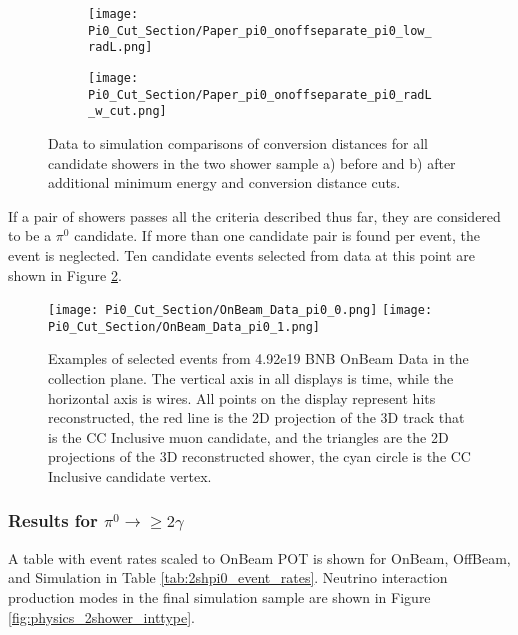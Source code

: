 \begin{figure}[H]
\centering
  \begin{subfigure}[t]{0.4\textwidth}
    \centering
\texttt{[image: Pi0\_Cut\_Section/Paper\_pi0\_onoffseparate\_pi0\_low\_radL.png]}
  \caption{ }
  \end{subfigure} 
  \hspace{20mm}
  \begin{subfigure}[t]{0.4\textwidth}
    \centering
\texttt{[image: Pi0\_Cut\_Section/Paper\_pi0\_onoffseparate\_pi0\_radL\_w\_cut.png]}
  \caption{ }
  \end{subfigure} 
\caption{ Data to simulation comparisons of conversion distances for all candidate showers in the two shower sample a) before and b) after additional minimum energy and conversion distance cuts. }
\label{fig:physics_radl_before_after}
\end{figure}

\par If a pair of showers passes all the criteria described thus far, they are considered to be a $\pi^0$ candidate. If more than one candidate pair is found per event, the event is neglected.  Ten candidate events selected from data at this point are shown in Figure \ref{fig:physics_pi0_onbeam_eventdisplays}.
\begin{figure}[h!]
\centering
\texttt{[image: Pi0\_Cut\_Section/OnBeam\_Data\_pi0\_0.png]}
\texttt{[image: Pi0\_Cut\_Section/OnBeam\_Data\_pi0\_1.png]}
\caption{ Examples of selected events from 4.92e19 BNB OnBeam Data in the collection plane. The vertical axis in all displays is time, while the horizontal axis is wires. All points on the display represent hits reconstructed, the red line is the 2D projection of the 3D track that is the CC Inclusive muon candidate, and the triangles are the 2D projections of the 3D reconstructed shower, the cyan circle is the CC Inclusive candidate vertex. }
\label{fig:physics_pi0_onbeam_eventdisplays}
\end{figure}

\clearpage
\subsubsection{Results for $\pi^0\rightarrow \geq 2 \gamma$}
\par A table with event rates scaled to OnBeam POT is shown for OnBeam, OffBeam, and Simulation in Table \ref{tab:2shpi0_event_rates}. Neutrino interaction production modes in the final simulation sample are shown in Figure \ref{fig:physics_2shower_inttype}. 

